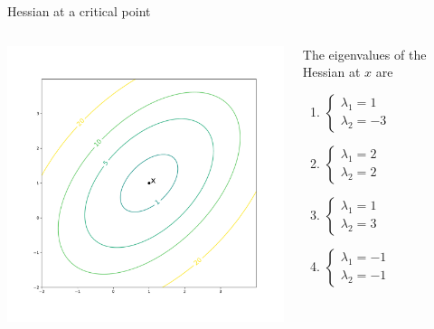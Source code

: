 \documentclass{beamer}
\begin{document}
\begin{frame}[t]{Hessian at a critical point}

	\vspace{-1.6cm}
	\begin{columns}
		\begin{column}{0.7\textwidth}
			\hspace*{-1.7cm}
			\includegraphics[width=11.0cm]{contour_min2.pdf}
		\end{column}
		\hspace*{0.2cm}
		\begin{column}{0.29\textwidth}
			The eigenvalues of the Hessian at $x$ are
			\begin{enumerate}
				\item $
					\begin{cases}
						\lambda_1 = 1 \\
						\lambda_2 = -3
					\end{cases}
					$
				\item $
					\begin{cases}
						\lambda_1 = 2 \\
						\lambda_2 = 2
					\end{cases}
					$
				\item $
					\begin{cases}
						\lambda_1 = 1 \\
						\lambda_2 = 3
					\end{cases}
					$
				\item $
					\begin{cases}
						\lambda_1 = -1 \\
						\lambda_2 = -1
					\end{cases}
					$
			\end{enumerate}
		\end{column}
	\end{columns}

\end{frame}
\end{document}
